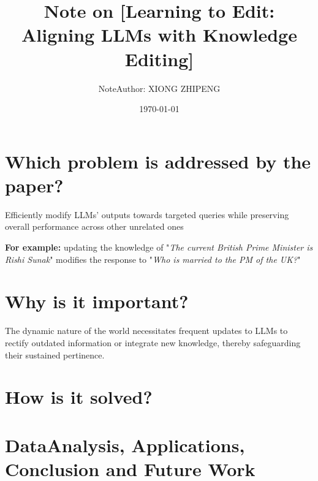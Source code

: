 \documentclass{article}
\title{Note on [Learning to Edit: Aligning LLMs with Knowledge Editing]}
\author{NoteAuthor: XIONG ZHIPENG}
\date{\today}
\begin{document}
\maketitle

\section{Which problem is addressed by the paper?}
Efficiently modify LLMs' outputs towards targeted queries while preserving overall performance across other unrelated ones

\textbf{For example:}
updating the knowledge of "\textit{The current British Prime Minister is Rishi Sunak}" 
modifies the response to "\textit{Who is married to the PM of the UK?}" 


\section{Why is it important?}

The dynamic nature of the world  necessitates frequent updates to LLMs to rectify outdated information 
or integrate new knowledge, thereby safeguarding their sustained pertinence.

\section{How is it solved?}

\section{DataAnalysis, Applications, Conclusion and Future Work}
\end{document}
